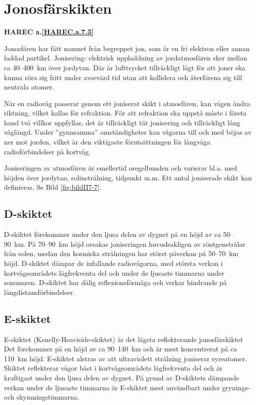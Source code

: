 \section{Jonosfärskikten}
\textbf{
HAREC a.\ref{HAREC.a.7.3}\label{myHAREC.a.7.3}
}

Jonosfären har fått namnet från begreppet jon, som är en fri elektron
eller annan laddad partikel. Jonisering- elektrisk uppladdning av
jordatmosfären sker mellan ca 40--400~km över jordytan. Där är
lufttrycket tillräckligt lågt för att joner ska kunna röra sig fritt
under avsevärd tid utan att kollidera och återförena sig till neutrala
atomer.

När en radiovåg passerar genom ett joniserat skikt i atmosfären,
kan vågen ändra riktning, vilket kallas för refraktion. För att
refraktion ska uppstå måste i första hand två villkor uppfyllas, det
är tillräckligt tät jonisering och tillräckligt lång våglängd. Under
''gynnsamma'' omständigheter kan vågorna till och med böjas av ner mot
jorden, vilket är den viktigaste förutsättningen för långväga
radioförbindelser på kortvåg.

Joniseringen av atmosfären är emellertid oregelbunden och varierar
bl.a. med höjden över jordytan, solinstrålning, tidpunkt m.m.  Ett
antal joniserade skikt kan definieras. Se Bild \ref{fig:bildII7-7}.

\subsection{D-skiktet}

D-skiktet förekommer under den ljusa delen av dygnet på en höjd av ca
50--90~km. På 70--90~km höjd orsakas joniseringen huvudsakligen av
röntgenstrålar från solen, medan den kosmiska strålningen har störst
påverkan på 50--70~km höjd. D-skiktet dämpar de infallande
radiovågorna, med största verkan i kortvågsområdets lågfrekventa del
och under de ljusaste timmarna under sommaren. D-skiktet har dålig
reflexionsförmåga och verkar hindrande på långdistansförbindelser.

\subsection{E-skiktet}

E-skiktet (Kenelly-Heaviside-skiktet) är det lägsta reflekterande
jonosfärskiktet Det förekommer på en höjd av ca 90--140~km och är mest
koncentrerat på ca 110~km höjd. E-skiktet alstras av att ultraviolett
strålning joniserar syreatomer. Skiktet reflekterar vågor bäst i
kortvågsområdets lågfrekventa del och är kraftigast under den ljusa
delen av dygnet. På grund av D-skiktets dämpande verkan under de
ljusaste timmarna är E-skiktet mest användbart under grynings- och
skymningstimmarna.

